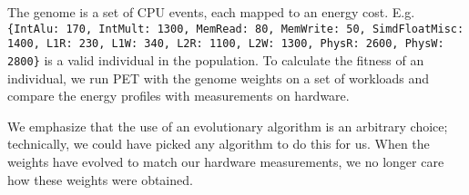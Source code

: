 The genome is a set of CPU events, each mapped to an energy cost. E.g.
\texttt{\{IntAlu: 170, IntMult: 1300, MemRead: 80, MemWrite: 50, SimdFloatMisc:
1400, L1R: 230, L1W: 340, L2R: 1100, L2W: 1300, PhysR: 2600, PhysW: 2800\}} is a
valid individual in the population. To calculate the fitness of an individual,
we run PET with the genome weights on a set of workloads and compare the energy
profiles with measurements on hardware.

We emphasize that the use of an evolutionary algorithm is an arbitrary choice;
technically, we could have picked any algorithm to do this for us. When the
weights have evolved to match our hardware measurements, we no longer care how
these weights were obtained.
